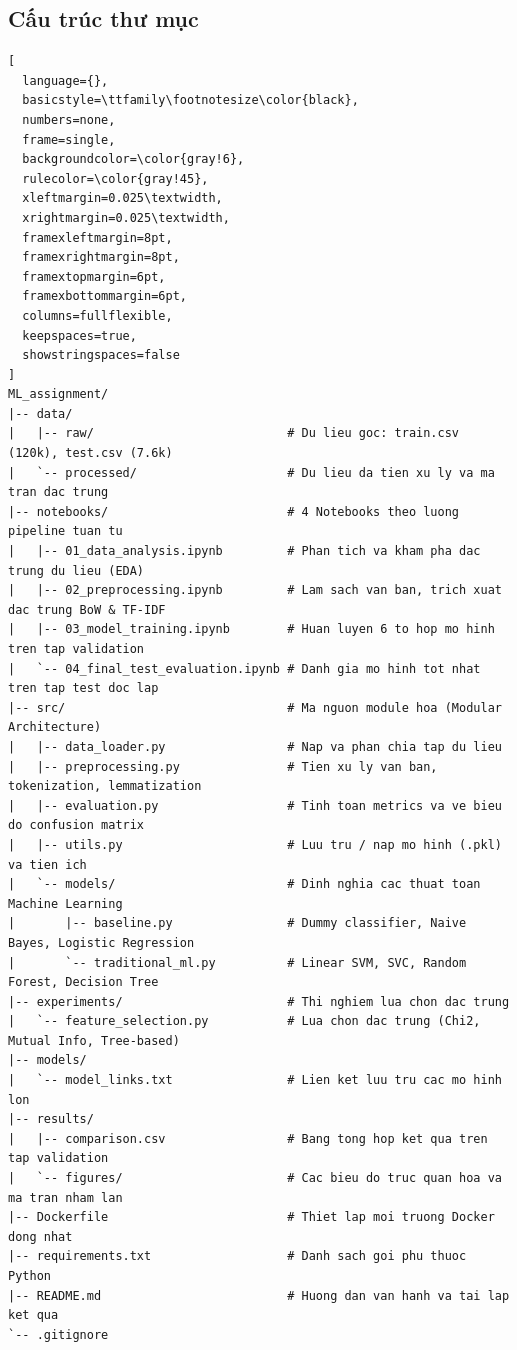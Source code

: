 \documentclass[12pt]{hcmut-report}
\begin{document}
\subsection{Cấu trúc thư mục}

\begin{lstlisting}[
  language={},
  basicstyle=\ttfamily\footnotesize\color{black},
  numbers=none,
  frame=single,
  backgroundcolor=\color{gray!6},
  rulecolor=\color{gray!45},
  xleftmargin=0.025\textwidth,
  xrightmargin=0.025\textwidth,
  framexleftmargin=8pt,
  framexrightmargin=8pt,
  framextopmargin=6pt,
  framexbottommargin=6pt,
  columns=fullflexible,
  keepspaces=true,
  showstringspaces=false
]
ML_assignment/
|-- data/
|   |-- raw/                           # Du lieu goc: train.csv (120k), test.csv (7.6k)
|   `-- processed/                     # Du lieu da tien xu ly va ma tran dac trung
|-- notebooks/                         # 4 Notebooks theo luong pipeline tuan tu
|   |-- 01_data_analysis.ipynb         # Phan tich va kham pha dac trung du lieu (EDA)
|   |-- 02_preprocessing.ipynb         # Lam sach van ban, trich xuat dac trung BoW & TF-IDF
|   |-- 03_model_training.ipynb        # Huan luyen 6 to hop mo hinh tren tap validation
|   `-- 04_final_test_evaluation.ipynb # Danh gia mo hinh tot nhat tren tap test doc lap
|-- src/                               # Ma nguon module hoa (Modular Architecture)
|   |-- data_loader.py                 # Nap va phan chia tap du lieu
|   |-- preprocessing.py               # Tien xu ly van ban, tokenization, lemmatization
|   |-- evaluation.py                  # Tinh toan metrics va ve bieu do confusion matrix
|   |-- utils.py                       # Luu tru / nap mo hinh (.pkl) va tien ich
|   `-- models/                        # Dinh nghia cac thuat toan Machine Learning
|       |-- baseline.py                # Dummy classifier, Naive Bayes, Logistic Regression
|       `-- traditional_ml.py          # Linear SVM, SVC, Random Forest, Decision Tree
|-- experiments/                       # Thi nghiem lua chon dac trung
|   `-- feature_selection.py           # Lua chon dac trung (Chi2, Mutual Info, Tree-based)
|-- models/
|   `-- model_links.txt                # Lien ket luu tru cac mo hinh lon
|-- results/
|   |-- comparison.csv                 # Bang tong hop ket qua tren tap validation
|   `-- figures/                       # Cac bieu do truc quan hoa va ma tran nham lan
|-- Dockerfile                         # Thiet lap moi truong Docker dong nhat
|-- requirements.txt                   # Danh sach goi phu thuoc Python
|-- README.md                          # Huong dan van hanh va tai lap ket qua
`-- .gitignore
\end{lstlisting}
\end{document}
